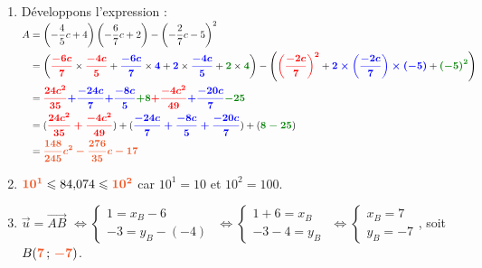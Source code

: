 \documentclass[a4paper,11pt]{article}
\newcounter{seancenum}
\begin{document}
\setcounter{seancenum}{21}
\newpage
\begin{seance}{} %

\begin{enumerate}
\item  Développons l'expression :\\
  $\begin{aligned}A &=\left(-\dfrac{4}{5}c+4\right)\left(-\dfrac{6}{7}c+2\right)-\left(-\dfrac{2}{7}c-5\right)^2\\&=\left({\color{red}\boldsymbol{\dfrac{-6c}{7}}}\times {\color{red}\boldsymbol{\dfrac{-4c}{5}}}
    +{\color{blue}\boldsymbol{\dfrac{-6c}{7}}}\times {\color{blue}\boldsymbol{4}}
    +{\color{blue}\boldsymbol{2}}\times {\color{blue}\boldsymbol{\dfrac{-4c}{5}}}
    +{\color[HTML]{008002}\boldsymbol{2}}\times {\color[HTML]{008002}\boldsymbol{4}}\right)-\left({\color{red}\boldsymbol{\left( \dfrac{-2c}{7}\right) ^2}}+{\color{blue}\boldsymbol{2\times \left( \dfrac{-2c}{7}\right) \times \left( -5\right) }}+{\color[HTML]{008002}\boldsymbol{\left( -5\right) ^2}}\right)\\&={\color{red}\boldsymbol{\frac{24c^2}{35}}}{\color{blue}\boldsymbol{+\frac{-24c}{7}}}{\color{blue}\boldsymbol{+\frac{-8c}{5}}}{\color[HTML]{008002}\boldsymbol{+8}}{\color{red}\boldsymbol{+\frac{-4c^2}{49}}}{\color{blue}\boldsymbol{+\frac{-20c}{7}}}{\color[HTML]{008002}\boldsymbol{-25}}\\&=({\color{red}\boldsymbol{\frac{24c^2}{35}+\frac{-4c^2}{49}}})+({\color{blue}\boldsymbol{\frac{-24c}{7}+\frac{-8c}{5}+\frac{-20c}{7}}})+({\color[HTML]{008002}\boldsymbol{8-25}})\\&={\color[HTML]{f15929}\boldsymbol{\dfrac{148}{245}c^2-\dfrac{276}{35}c-17}}\end{aligned}$

\item  ${\color[HTML]{f15929}\boldsymbol{10^{1}}} \leqslant 84{,}074 \leqslant {\color[HTML]{f15929}\boldsymbol{10^{2}}}$ car $10^{1} = 10$ et $10^{2} = 100.$

\item  $\overrightarrow{u}=\overrightarrow{AB}$ $\Leftrightarrow\begin{cases}1=x_B-6\\-3=y_B-(-4)\end{cases}$ $\Leftrightarrow\begin{cases}1+6=x_B\\-3-4=y_B\end{cases}$ $\Leftrightarrow\begin{cases}x_B=7\\y_B=-7\end{cases}$, soit $B({\color[HTML]{f15929}\boldsymbol{7}}\,;\,{\color[HTML]{f15929}\boldsymbol{-7}})$.


\end{enumerate}
\end{seance}
\end{document}
